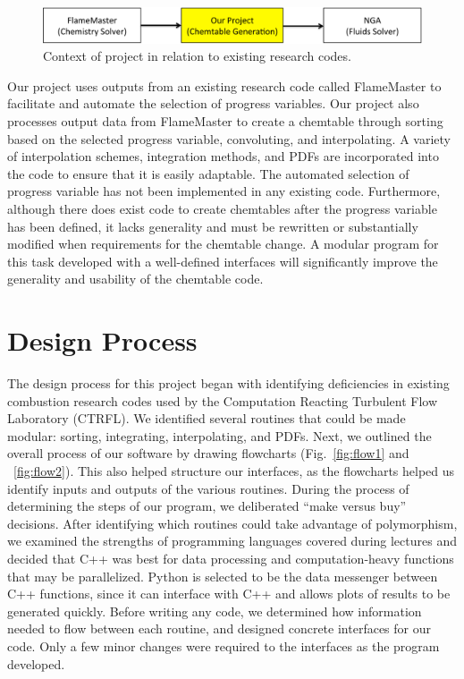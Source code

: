 \documentclass[11pt]{article}
\begin{document}
\begin{figure} [h]
\centering
\includegraphics[width=\textwidth]{scope}
\caption{\label{fig:overview} Context of project in relation to existing research codes.}
\end{figure}

Our project uses outputs from an existing research code called FlameMaster to facilitate and automate the selection of progress variables. Our project also processes output data from FlameMaster to create a chemtable through sorting based on the selected progress variable, convoluting, and interpolating. A variety of interpolation schemes, integration methods, and PDFs are incorporated into the code to ensure that it is easily adaptable. The automated selection of progress variable has not been implemented in any existing code. Furthermore, although there does exist code to create chemtables after the progress variable has been defined, it lacks generality and must be rewritten or substantially modified when requirements for the chemtable change. A modular program for this task developed with a well-defined interfaces will significantly improve the generality and usability of the chemtable code. 

\section{Design Process}
The design process for this project began with identifying deficiencies in existing combustion research codes used by the Computation Reacting Turbulent Flow Laboratory (CTRFL). We identified several routines that could be made modular: sorting, integrating, interpolating, and PDFs. Next, we outlined the overall process of our software by drawing flowcharts (Fig.~\ref{fig:flow1} and ~\ref{fig:flow2}). This also helped structure our interfaces, as the flowcharts helped us identify inputs and outputs of the various routines. During the process of determining the steps of our program, we deliberated “make versus buy” decisions. After identifying which routines could take advantage of polymorphism, we examined the strengths of programming languages covered during lectures and decided that C++ was best for data processing and computation-heavy functions that may be parallelized. Python is selected to be the data messenger between C++ functions, since it can interface with C++ and allows plots of results to be generated quickly. Before writing any code, we determined how information needed to flow between each routine, and designed concrete interfaces for our code. Only a few minor changes were required to the interfaces as the program developed. 
\end{document}
